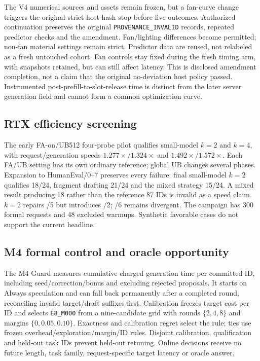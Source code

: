 The V4 numerical sources and assets remain frozen, but a fan-curve change triggers the original strict host-hash stop before live outcomes. Authorized continuation preserves the original \texttt{PROVENANCE\_INVALID} records, repeated predictor checks and the amendment. Fan/lighting differences become permitted; non-fan material settings remain strict. Predictor data are reused, not relabeled as a fresh untouched cohort. Fan controls stay fixed during the fresh timing arm, with snapshots retained, but can still affect latency. This is disclosed amendment completion, not a claim that the original no-deviation host policy passed. Instrumented post-prefill-to-slot-release time is distinct from the later server generation field and cannot form a common optimization curve.

\subsection{RTX efficiency screening}
The early FA-on/UB512 four-probe pilot qualifies small-model $k=2$ and $k=4$, with request/generation speeds $1.277\times/1.324\times$ and $1.492\times/1.572\times$. Each FA/UB setting has its own ordinary reference; global UB changes several phases. Expansion to HumanEval/0--7 preserves every failure: final small-model $k=2$ qualifies 18/24, fragment drafting 21/24 and the mixed strategy 15/24. A mixed result producing 18 rather than the reference 87 IDs is invalid as a speed claim. $k=2$ repairs /5 but introduces /2; /6 remains divergent. The campaign has 300 formal requests and 48 excluded warmups. Synthetic favorable cases do not support the current headline.

\subsection{M4 formal control and oracle opportunity}
The M4 Guard measures cumulative charged generation time per committed ID, including seed/correction/bonus and excluding rejected proposals. It starts on Always speculation and can fall back permanently after a completed round, reconciling invalid target/draft suffixes first. Calibration freezes target cost per ID and selects \texttt{E8\_M000} from a nine-candidate grid with rounds $\{2,4,8\}$ and margins $\{0,0.05,0.10\}$. Exactness and calibration regret select the rule; ties use frozen overhead/exploration/margin/ID rules. Disjoint calibration, qualification and held-out task IDs prevent held-out retuning. Online decisions receive no future length, task family, request-specific target latency or oracle answer.


